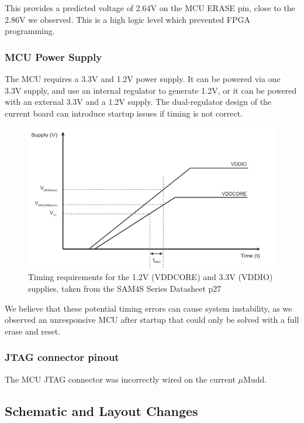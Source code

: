 \documentclass[12pt]{article}
\begin{document}
This provides a predicted voltage of 2.64V on the MCU ERASE pin, close to the 2.86V we observed. This is a high logic level which prevented FPGA programming.

\subsubsection{MCU Power Supply}

The MCU requires a 3.3V and 1.2V power supply. It can be powered via one 3.3V supply, and use an internal regulator to generate 1.2V, or it can be powered with an external 3.3V and a 1.2V supply. The dual-regulator design of the current board can introduce startup issues if timing is not correct.

\begin{figure}
	\begin{center}
	\includegraphics[width=13cm]{power_timing.png}
	\caption{Timing requirements for the 1.2V (VDDCORE) and 3.3V (VDDIO) supplies, taken from the SAM4S Series Datasheet p27}	
	\end{center}
\end{figure}

We believe that these potential timing errors can cause system instability, as we observed an unresponsive MCU after startup that could only be solved with a full erase and reset.

\subsubsection{JTAG connector pinout}

The MCU JTAG connector was incorrectly wired on the current $\mu$Mudd.

\subsection{Schematic and Layout Changes}
\end{document}
